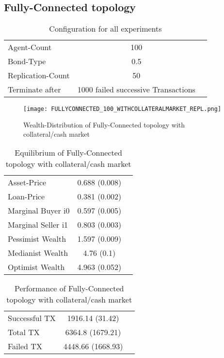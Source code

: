 \documentclass[Bachelorarbeit.tex]{subfiles}
\begin{document}
\subsection{Fully-Connected topology}
\begin{table}[H]
	\centering
	\caption{Configuration for all experiments}
	\begin{tabular} { l c r }
		\hline
		Agent-Count & 100 \\
		Bond-Type & 0.5 \\
		Replication-Count & 50 \\
		Terminate after & 1000 failed successive Transactions \\
		\hline
	\end{tabular}
\end{table}

\begin{figure}[H]
	\centering
  \texttt{[image: FULLYCONNECTED\_100\_WITHCOLLATERALMARKET\_REPL.png]}
	\caption{Wealth-Distribution of Fully-Connected topology with collateral/cash market}
	\label{fig:wealth_FULLYCONNECTED_100_WITHCOLLATERALMARKET_REPL}
\end{figure}

\begin{table}[H]
	\caption{Equilibrium of Fully-Connected topology with collateral/cash market}
	\centering
	\begin{tabular} { l c r }
		\hline
		Asset-Price & 0.688 (0.008) \\
		Loan-Price & 0.381 (0.002) \\
		Marginal Buyer i0 & 0.597 (0.005) \\
		Marginal Seller i1 & 0.803 (0.003) \\
		\hline
		Pessimist Wealth & 1.597 (0.009) \\
		Medianist Wealth & 4.76 (0.1) \\
		Optimist Wealth & 4.963 (0.052) \\
		\hline
	\end{tabular}
\end{table} 

\begin{table}[H]
	\caption{Performance of Fully-Connected topology with collateral/cash market}
	\centering
	\begin{tabular} { l c r }
		\hline
		Successful TX & 1916.14 (31.42) \\
		Total TX & 6364.8 (1679.21) \\
		Failed TX & 4448.66 (1668.93) \\
		\hline
	\end{tabular}
\end{table}
\end{document}

